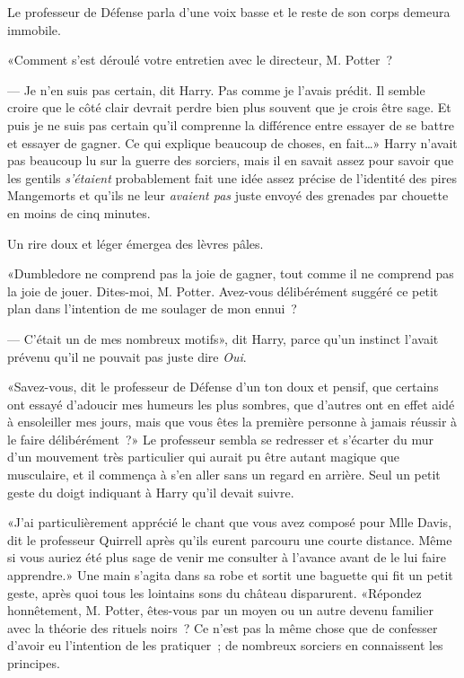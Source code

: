 Le professeur de Défense parla d'une voix basse et le reste de son corps demeura immobile.

«Comment s'est déroulé votre entretien avec le directeur, M. Potter~?

--- Je n'en suis pas certain, dit Harry. Pas comme je l'avais prédit. Il semble croire que le côté clair devrait perdre bien plus souvent que je crois être sage. Et puis je ne suis pas certain qu'il comprenne la différence entre essayer de se battre et essayer de gagner. Ce qui explique beaucoup de choses, en fait…» Harry n'avait pas beaucoup lu sur la guerre des sorciers, mais il en savait assez pour savoir que les gentils \emph{s'étaient} probablement fait une idée assez précise de l'identité des pires Mangemorts et qu'ils ne leur \emph{avaient pas} juste envoyé des grenades par chouette en moins de cinq minutes.

Un rire doux et léger émergea des lèvres pâles.

«Dumbledore ne comprend pas la joie de gagner, tout comme il ne comprend pas la joie de jouer. Dites-moi, M. Potter. Avez-vous délibérément suggéré ce petit plan dans l'intention de me soulager de mon ennui~?

--- C'était un de mes nombreux motifs», dit Harry, parce qu'un instinct l'avait prévenu qu'il ne pouvait pas juste dire \emph{Oui}.

«Savez-vous, dit le professeur de Défense d'un ton doux et pensif, que certains ont essayé d'adoucir mes humeurs les plus sombres, que d'autres ont en effet aidé à ensoleiller mes jours, mais que vous êtes la première personne à jamais réussir à le faire délibérément~?» Le professeur sembla se redresser et s'écarter du mur d'un mouvement très particulier qui aurait pu être autant magique que musculaire, et il commença à s'en aller sans un regard en arrière. Seul un petit geste du doigt indiquant à Harry qu'il devait suivre.

«J'ai particulièrement apprécié le chant que vous avez composé pour Mlle Davis, dit le professeur Quirrell après qu'ils eurent parcouru une courte distance. Même si vous auriez été plus sage de venir me consulter à l'avance avant de le lui faire apprendre.» Une main s'agita dans sa robe et sortit une baguette qui fit un petit geste, après quoi tous les lointains sons du château disparurent. «Répondez honnêtement, M. Potter, êtes-vous par un moyen ou un autre devenu familier avec la théorie des rituels noirs~? Ce n'est pas la même chose que de confesser d'avoir eu l'intention de les pratiquer~; de nombreux sorciers en connaissent les principes.

